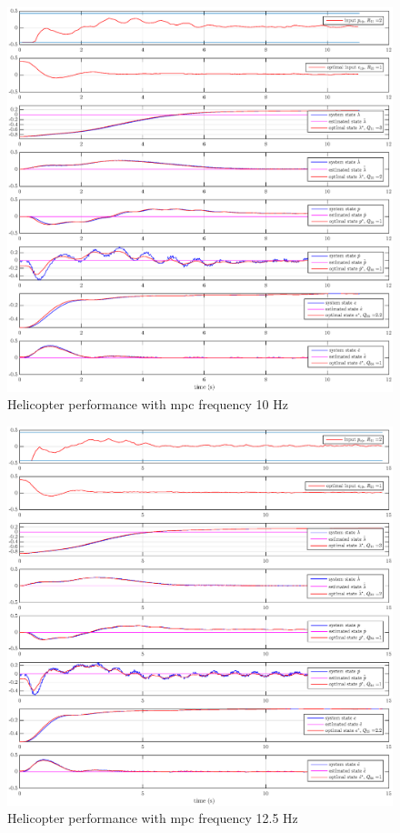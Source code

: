 \begin{figure}
    \centering
    \includegraphics[scale=0.43]{fig/heli_sim_10_15.eps}
    \caption{Helicopter performance with \acrshort{mpc} frequency 10 Hz}
    \label{fig:heli_sim_10_1}
\end{figure}

\begin{figure}
    \centering
    \includegraphics[scale=0.43]{fig/heli_sim_125_15.eps}
    \caption{Helicopter performance with \acrshort{mpc} frequency 12.5 Hz}
    \label{fig:heli_sim_125_1}
\end{figure}

